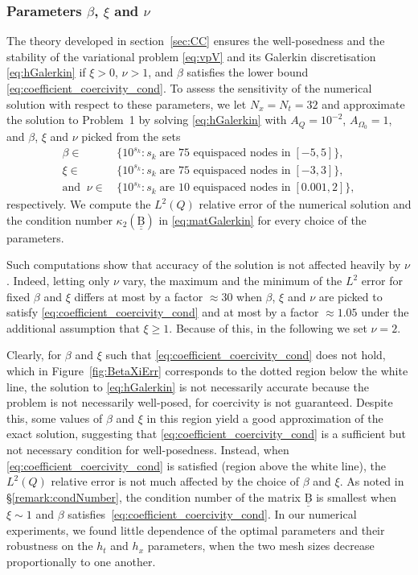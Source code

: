 \documentclass[a4paper]{article}
\theoremstyle{plain}
\theoremstyle{definition}
\newcommand{\mat}[1]{\underline{\underline{\mathrm{#1}}}}
\newcommand{\OZ}{{\Omega_0}}
\begin{document}
\subsubsection{Parameters \texorpdfstring{$\beta$}{beta}, \texorpdfstring{$\xi$}{xi} and \texorpdfstring{$\nu$}{nu}}
The theory developed in section~\ref{sec:CC} ensures the well-posedness and the stability of the variational problem \eqref{eq:vpV} and its Galerkin discretisation \eqref{eq:hGalerkin} if $\xi>0$, $\nu>1$, and $\beta$ satisfies the lower bound \eqref{eq:coefficient_coercivity_cond}.
To assess the sensitivity of the numerical solution with respect to these parameters, we let $N_x = N_t = 32$ and approximate the solution to Problem~1 by solving \eqref{eq:hGalerkin}
with $A_Q=10^{-2}$, $A_\OZ=1$, and $\beta$, $\xi$ and $\nu$ picked from the sets
\begin{align}\nonumber
	\beta\in\,&\big\{10^{s_k}: s_k\;\text{are $75$ equispaced nodes in}\;[-5, 5]\big\},\\
    \xi\in\,&\big\{10^{s_k}: s_k\;\text{are $75$ equispaced nodes in}\;[-3, 3]\big\},
	\label{eq:SetBetaXi}\\
	\nonumber
	\text{and}\;\;
	\nonumber
	\nu\in\,&\big\{10^{s_k}: s_k\;\text{are $10$ equispaced nodes in}\;[0.001, 2]\big\},
\end{align}
respectively.
We compute the $L^2(Q)$ relative error of the numerical solution and the condition number $\kappa_2(\mat B)$ in \eqref{eq:matGalerkin} for every choice of the parameters.

Such computations show that accuracy of the solution is not affected heavily by $\nu$.
Indeed, letting only $\nu$ vary, the maximum and the minimum of the $L^2$ error for fixed $\beta$ and $\xi$ differs at most by a factor $\approx30$ when $\beta$, $\xi$ and $\nu$ are picked to satisfy \eqref{eq:coefficient_coercivity_cond} and at most by a factor $\approx1.05$ under the additional assumption that $\xi\ge1$. Because of this, in the following we set $\nu=2$.

Clearly, for $\beta$ and $\xi$ such that \eqref{eq:coefficient_coercivity_cond} does not hold, which in Figure~\ref{fig:BetaXiErr} corresponds to the dotted region below the white line, the solution to \eqref{eq:hGalerkin} is not necessarily accurate because the problem is not necessarily well-posed, for coercivity is not guaranteed.
Despite this, some values of $\beta$ and $\xi$ in this region yield a good approximation of the exact solution, suggesting that \eqref{eq:coefficient_coercivity_cond} is a sufficient but not necessary condition for well-posedness.
Instead, when \eqref{eq:coefficient_coercivity_cond} is satisfied (region above the white line), the $L^2(Q)$ relative error is not much affected by the choice of $\beta$ and $\xi$. As noted in \S\ref{remark:condNumber}, the condition number of the matrix $\mat B$ is smallest when $\xi\sim1$ and $\beta$ satisfies~\eqref{eq:coefficient_coercivity_cond}.
In our numerical experiments, we found little dependence of the optimal parameters and their robustness on the $h_t$ and $h_x$ parameters, when the two mesh sizes decrease proportionally to one another.
\end{document}
